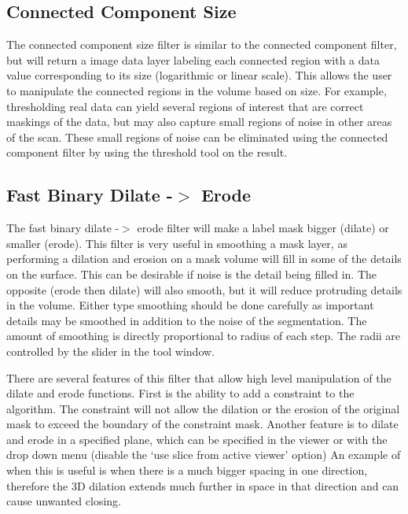 \documentclass[fleqn,11pt,openany]{book}
\begin{document}
\subsection{Connected Component Size}

The connected component size filter is similar to the connected component filter, but will return a image data layer labeling each connected region with a data value corresponding to its size (logarithmic or linear scale).  This allows the user to manipulate the connected regions in the volume based on size.  For example, thresholding real data can yield several regions of interest that are correct maskings of the data, but may also capture small regions of noise in other areas of the scan.  These small regions of noise can be eliminated using the connected component filter by using the threshold tool on the result.  

\subsection{Fast Binary Dilate -$>$ Erode}

The fast binary dilate -$>$ erode filter will make a label mask bigger (dilate) or smaller (erode).  This filter is very useful in smoothing a mask layer, as performing a dilation and erosion on a mask volume will fill in some of the details on the surface.  This can be desirable if noise is the detail being filled in.  The opposite (erode then dilate) will also smooth, but it will reduce protruding details in the volume.  Either type smoothing should be done carefully as important details may be smoothed in addition to the noise of the segmentation. The amount of smoothing is directly proportional to radius of each step.  The radii are controlled by the slider in the tool window.  

There are several features of this filter that allow high level manipulation of the dilate and erode functions.  First is the ability to add a constraint to the algorithm.  The constraint will not allow the dilation or the erosion of the original mask to exceed the boundary of the constraint mask.  Another feature is to dilate and erode in a specified plane, which can be specified in the viewer or with the drop down menu (disable the `use slice from active viewer' option)  An example of when this is useful is when there is a much bigger spacing in one direction, therefore the 3D dilation extends much further in space in that direction and can cause unwanted closing. 
\end{document}
